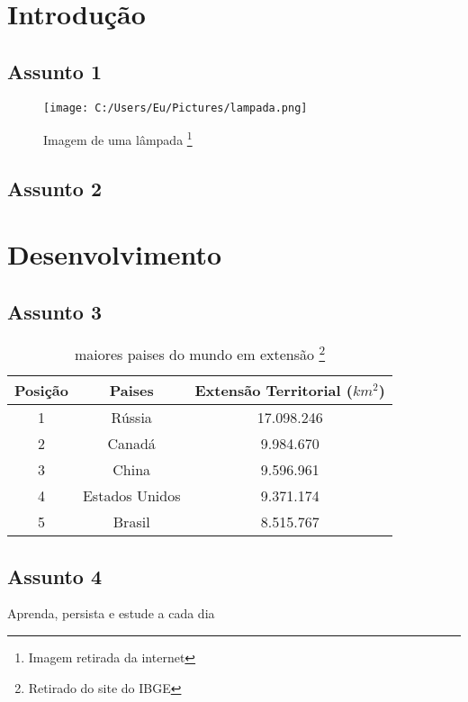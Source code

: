 \documentclass[12pt, a4paper, oneside]{book}
\begin{document}
\tableofcontents
\newpage
\listoffigures
\listoftables


\chapter{Introdução}
\section{Assunto 1}
\begin{figure}[h]
\centering
\texttt{[image: C:/Users/Eu/Pictures/lampada.png]}
\label{ImagemLampada}
\caption{Imagem de uma lâmpada  \cite{SOUZA}\footnote{Imagem retirada da internet}}
\end{figure}

\section{Assunto 2}
\chapter{Desenvolvimento}

\section{Assunto 3}

\begin{table}[h]
\centering  %
\caption{maiores paises do mundo em extensão \cite{IBGE}\footnote{Retirado do site do IBGE}} %
\vspace{0.5cm}
\begin{tabular}{c|cc}
Posição & Paises & Extensão Territorial ($km^{2}$)\\
\hline
1 & Rússia &          17.098.246\\
2 & Canadá &           9.984.670\\
3 & China &            9.596.961\\
4 & Estados Unidos &   9.371.174\\
5 & Brasil &           8.515.767\\
\end{tabular}
\end{table}
\section{Assunto 4}
Aprenda, persista e estude a cada dia \cite{SOUZA} %
\end{document}
